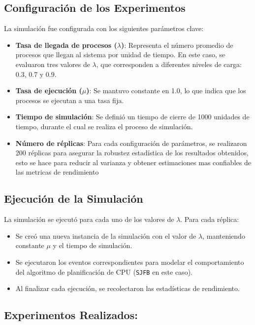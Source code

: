 \documentclass[12pt]{article}
\begin{document}
\subsection{Configuración de los Experimentos}

La simulación fue configurada con los siguientes parámetros clave:


\begin{itemize}
	\item \textbf{Tasa de llegada de procesos (\(\lambda\))}: Representa el número promedio de procesos que llegan al sistema por unidad de tiempo. En este caso, se evaluaron tres valores de \(\lambda\), que corresponden a diferentes niveles de carga: 0.3, 0.7 y 0.9.
	\item \textbf{Tasa de ejecución (\(\mu\))}: Se mantuvo constante en 1.0, lo que indica que los procesos se ejecutan a una tasa fija.
	\item \textbf{Tiempo de simulación}: Se definió un tiempo de cierre de 1000 unidades de tiempo, durante el cual se realiza el proceso de simulación.
	\item \textbf{Número de réplicas}: Para cada configuración de parámetros, se realizaron 200 réplicas para asegurar la robustez estadística de los resultados obtenidos, esto se hace para reducir al varianza y obtener estimaciones mas confiables de las metricas de rendimiento
\end{itemize}

\subsection{Ejecución de la Simulación}

La simulación se ejecutó para cada uno de los valores de \(\lambda\). Para cada réplica:
\begin{itemize}
	\item Se creó una nueva instancia de la simulación con el valor de \(\lambda\), manteniendo constante \(\mu\) y el tiempo de simulación.
	\item Se ejecutaron los eventos correspondientes para modelar el comportamiento del algoritmo de planificación de CPU (\texttt{SJFB} en este caso).
	\item Al finalizar cada ejecución, se recolectaron las estadísticas de rendimiento.
\end{itemize}


\subsection{Experimentos Realizados:}
\end{document}
